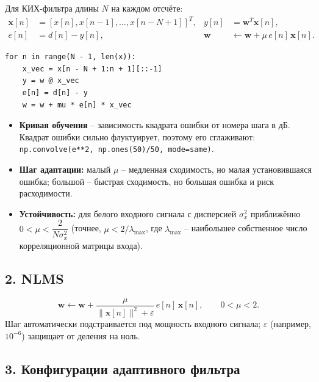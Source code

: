 \documentclass[12pt,a4paper,openany]{book}
\providecommand{\tightlist}{\setlength{\itemsep}{0pt}\setlength{\parskip}{0pt}}
\begin{document}
Для КИХ-фильтра длины \(N\) на каждом отсчёте:
\[
\begin{aligned}
\mathbf{x}[n] &= [x[n], x[n-1], \dots, x[n-N+1]]^T, & y[n] &= \mathbf{w}^T\mathbf{x}[n], \\
e[n] &= d[n] - y[n], & \mathbf{w} &\leftarrow \mathbf{w} + \mu\,e[n]\,\mathbf{x}[n].
\end{aligned}
\]

\begin{Verbatim}[fontsize=\small, breaklines, breakanywhere]
for n in range(N - 1, len(x)):
    x_vec = x[n - N + 1:n + 1][::-1]
    y = w @ x_vec
    e[n] = d[n] - y
    w = w + mu * e[n] * x_vec
\end{Verbatim}

\begin{itemize}
\tightlist
\item
  \textbf{Кривая обучения} -- зависимость квадрата ошибки от номера шага в дБ. Квадрат ошибки сильно флуктуирует, поэтому его сглаживают: \texttt{np.\allowbreak{}convolve(\allowbreak{}e**2,\allowbreak{}\ np.\allowbreak{}ones(\allowbreak{}50)/\allowbreak{}50,\allowbreak{}\ mode=\allowbreak{}\textquotesingle{}\allowbreak{}same\textquotesingle{}\allowbreak{})}.
\item
  \textbf{Шаг адаптации:} малый \(\mu\) -- медленная сходимость, но малая установившаяся ошибка; большой -- быстрая сходимость, но большая ошибка и риск расходимости.
\item
  \textbf{Устойчивость:} для белого входного сигнала с дисперсией \(\sigma_x^2\) приближённо \(0 < \mu < \dfrac{2}{N\sigma_x^2}\) (точнее, \(\mu < 2/\lambda_{\max}\), где \(\lambda_{\max}\) -- наибольшее собственное число корреляционной матрицы входа).
\end{itemize}

\subsection*{2. NLMS}

\[
\mathbf{w} \leftarrow \mathbf{w} + \frac{\mu}{\|\mathbf{x}[n]\|^2 + \varepsilon}\,e[n]\,\mathbf{x}[n], \qquad 0 < \mu < 2.
\]
Шаг автоматически подстраивается под мощность входного сигнала; \(\varepsilon\) (например, \(10^{-6}\)) защищает от деления на ноль.

\subsection*{3. Конфигурации адаптивного фильтра}
\end{document}
